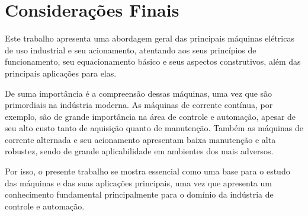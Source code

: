 \section{Considerações Finais}

Este trabalho apresenta uma abordagem geral das principais máquinas elétricas de uso industrial e seu acionamento, atentando aos seus princípios de funcionamento, seu equacionamento básico e seus aspectos construtivos, além das principais aplicações para elas.

De suma importância é a compreensão dessas máquinas, uma vez que são primordiais na indústria moderna. As máquinas de corrente contínua, por exemplo, são de grande importância na área de controle e automação, apesar de seu alto custo tanto de aquisição quanto de manutenção. Também as máquinas de corrente alternada e seu acionamento apresentam baixa manutenção e alta robustez, sendo de grande aplicabilidade em ambientes dos mais adversos.

Por isso, o presente trabalho se mostra essencial como uma base para o estudo das máquinas e das suas aplicações principais, uma vez que apresenta um conhecimento fundamental principalmente para o domínio da indústria de controle e automação.

